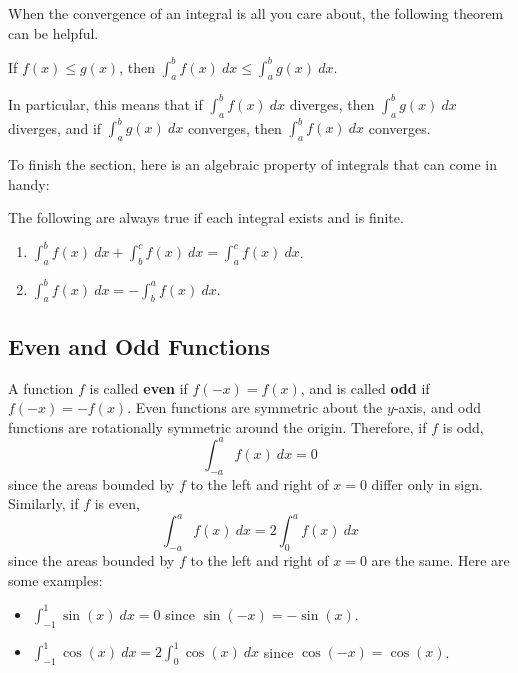 When the convergence of an integral is all you care about, the following theorem can be helpful.

\begin{theorem}
If $f(x) \leq g(x)$, then $\int_a^b f(x)\ dx \leq \int_a^b g(x)\ dx$.
\end{theorem}

In particular, this means that if $\int_a^b f(x)\ dx$ diverges, then $\int_a^b g(x)\ dx$ diverges, and if $\int_a^b g(x)\ dx$ converges, then $\int_a^b f(x)\ dx$ converges.


To finish the section, here is an algebraic property of integrals that can come in handy:
\begin{theorem} The following are always true if each integral exists and is finite.
\begin{enumerate}
\item $\displaystyle\int_a^bf(x)\ dx + \int_b^cf(x)\ dx = \int_a^c f(x)\ dx$.
\item $\displaystyle\int_a^bf(x)\ dx = -\int_b^a f(x)\ dx$.
\end{enumerate}
\end{theorem}


\subsection{Even and Odd Functions}

A function $f$ is called \textbf{even} if $f(-x)=f(x)$, and is called \textbf{odd} if $f(-x)=-f(x)$. Even functions are symmetric about the $y$-axis, and odd functions are rotationally symmetric around the origin. Therefore, if $f$ is odd,
$$\int_{-a}^af(x)\ dx = 0$$
since the areas bounded by $f$ to the left and right of $x=0$ differ only in sign. Similarly, if $f$ is even,
$$\int_{-a}^af(x)\ dx = 2\int_{0}^af(x)\ dx$$
since the areas bounded by $f$ to the left and right of $x=0$ are the same.
Here are some examples:
\begin{itemize}
\item $\int_{-1}^1\sin(x)\ dx = 0$ since $\sin(-x)=-\sin(x)$.
\item $\int_{-1}^1\cos(x)\ dx = 2\int_0^1\cos(x)\ dx$ since $\cos(-x)=\cos(x)$.
\end{itemize}




